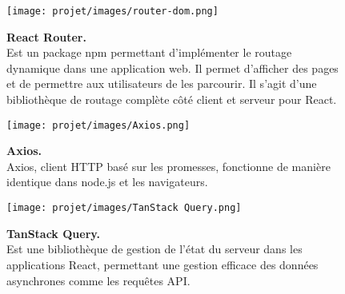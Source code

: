 \begin{figure}[H]
    \centering
    \begin{minipage}[c]{0.3\textwidth}
        \texttt{[image: projet/images/router-dom.png]}
    \end{minipage}
    \hspace{1cm}
    \begin{minipage}[c]{0.6\textwidth}
        \textbf{React Router.}\\[0.5em]
    Est un package npm permettant d'implémenter le routage dynamique dans une application web. Il permet d'afficher des pages et de permettre aux utilisateurs de les parcourir. Il s'agit d'une bibliothèque de routage complète côté client et serveur pour React.  \cite{ref18}
    \end{minipage}
\end{figure}
\vspace{0.5cm}

\begin{figure}[H]
    \centering
    \begin{minipage}[c]{0.3\textwidth}
        \texttt{[image: projet/images/Axios.png]}
    \end{minipage}
    \hspace{1cm}
    \begin{minipage}[c]{0.6\textwidth}
        \textbf{Axios.}\\[0.5em]
   Axios, client HTTP basé sur les promesses, fonctionne de manière identique dans node.js et les navigateurs. \cite{ref19}
    \end{minipage}
\end{figure}
\vspace{0.5cm}

\begin{figure}[H]
    \centering
    \begin{minipage}[c]{0.3\textwidth}
        \texttt{[image: projet/images/TanStack Query.png]}
    \end{minipage}
    \hspace{1cm}
    \begin{minipage}[c]{0.6\textwidth}
        \textbf{TanStack Query.}\\[0.5em]
    Est une bibliothèque de gestion de l'état du serveur dans les applications React, permettant une gestion efficace des données asynchrones comme les requêtes API. \cite{ref20}
    \end{minipage}
\end{figure}
\vspace{0.5cm}

